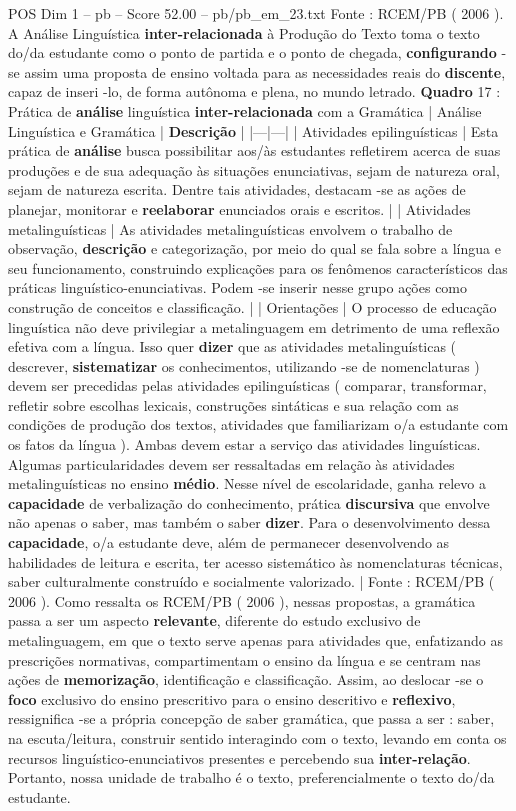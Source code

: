 \begin{textsample}{POS Dim 1 – pb – Score 52.00 – pb/pb\_em\_23.txt}
Fonte : RCEM/PB ( 2006 ).
A Análise Linguística \textbf{inter-relacionada} à Produção do Texto toma o texto do/da estudante como o ponto de partida e o ponto de chegada, \textbf{configurando} -se assim uma proposta de ensino voltada para as necessidades reais do \textbf{discente}, capaz de inseri -lo, de forma autônoma e plena, no mundo letrado. \textbf{Quadro} 17 : Prática de \textbf{análise} linguística \textbf{inter-relacionada} com a Gramática | Análise Linguística e Gramática | \textbf{Descrição} | |---|---| | Atividades epilinguísticas | Esta prática de \textbf{análise} busca possibilitar aos/às estudantes refletirem acerca de suas produções e de sua adequação às situações enunciativas, sejam de natureza oral, sejam de natureza escrita.
Dentre tais atividades, destacam -se as ações de planejar, monitorar e \textbf{reelaborar} enunciados orais e escritos. | | Atividades metalinguísticas | As atividades metalinguísticas envolvem o trabalho de observação, \textbf{descrição} e categorização, por meio do qual se fala sobre a língua e seu funcionamento, construindo explicações para os fenômenos característicos das práticas linguístico-enunciativas.
Podem -se inserir nesse grupo ações como construção de conceitos e classificação. | | Orientações | O processo de educação linguística não deve privilegiar a metalinguagem em detrimento de uma reflexão efetiva com a língua.
Isso quer \textbf{dizer} que as atividades metalinguísticas ( descrever, \textbf{sistematizar} os conhecimentos, utilizando -se de nomenclaturas ) devem ser precedidas pelas atividades epilinguísticas ( comparar, transformar, refletir sobre escolhas lexicais, construções sintáticas e sua relação com as condições de produção dos textos, atividades que familiarizam o/a estudante com os fatos da língua ).
Ambas devem estar a serviço das atividades linguísticas.
Algumas particularidades devem ser ressaltadas em relação às atividades metalinguísticas no ensino \textbf{médio}.
Nesse nível de escolaridade, ganha relevo a \textbf{capacidade} de verbalização do conhecimento, prática \textbf{discursiva} que envolve não apenas o saber, mas também o saber \textbf{dizer}.
Para o desenvolvimento dessa \textbf{capacidade}, o/a estudante deve, além de permanecer desenvolvendo as habilidades de leitura e escrita, ter acesso sistemático às nomenclaturas técnicas, saber culturalmente construído e socialmente valorizado. | Fonte : RCEM/PB ( 2006 ).
Como ressalta os RCEM/PB ( 2006 ), nessas propostas, a gramática passa a ser um aspecto \textbf{relevante}, diferente do estudo exclusivo de metalinguagem, em que o texto serve apenas para atividades que, enfatizando as prescrições normativas, compartimentam o ensino da língua e se centram nas ações de \textbf{memorização}, identificação e classificação.
Assim, ao deslocar -se o \textbf{foco} exclusivo do ensino prescritivo para o ensino descritivo e \textbf{reflexivo}, ressignifica -se a própria concepção de saber gramática, que passa a ser : saber, na escuta/leitura, construir sentido interagindo com o texto, levando em conta os recursos linguístico-enunciativos presentes e percebendo sua \textbf{inter-relação}.
Portanto, nossa unidade de trabalho é o texto, preferencialmente o texto do/da estudante.


\end{textsample}
